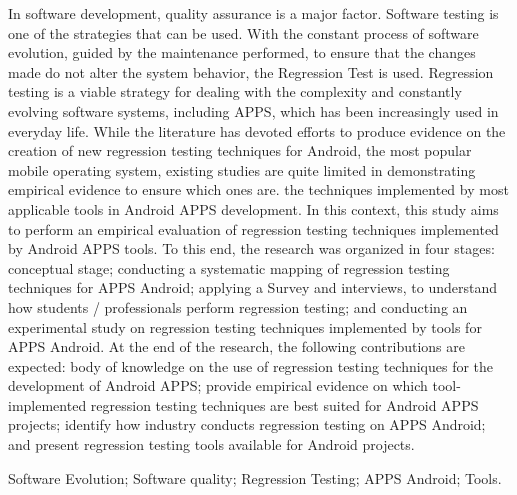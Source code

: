 


\abstract


In software development, quality assurance is a major factor. Software testing is one of the strategies that can be used. With the constant process of software evolution, guided by the maintenance performed, to ensure that the changes made do not alter the system behavior, the Regression Test is used. Regression testing is a viable strategy for dealing with the complexity and constantly evolving software systems, including APPS, which has been increasingly used in everyday life. While the literature has devoted efforts to produce evidence on the creation of new regression testing techniques for Android, the most popular mobile operating system, existing studies are quite limited in demonstrating empirical evidence to ensure which ones are. the techniques implemented by most applicable tools in Android \ac {APPS} development. In this context, this study aims to perform an empirical evaluation of regression testing techniques implemented by Android \ac {APPS} tools. To this end, the research was organized in four stages: conceptual stage; conducting a systematic mapping of regression testing techniques for \ac {APPS} Android; applying a Survey and interviews, to understand how students / professionals perform regression testing; and conducting an experimental study on regression testing techniques implemented by tools for \ac {APPS} Android. At the end of the research, the following contributions are expected: body of knowledge on the use of regression testing techniques for the development of Android \ac {APPS}; provide empirical evidence on which tool-implemented regression testing techniques are best suited for Android \ac {APPS} projects; identify how industry conducts regression testing on \ac {APPS} Android; and present regression testing tools available for Android projects.

\begin{keywords}
Software Evolution; Software quality; Regression Testing; APPS Android; Tools.%
\end{keywords}